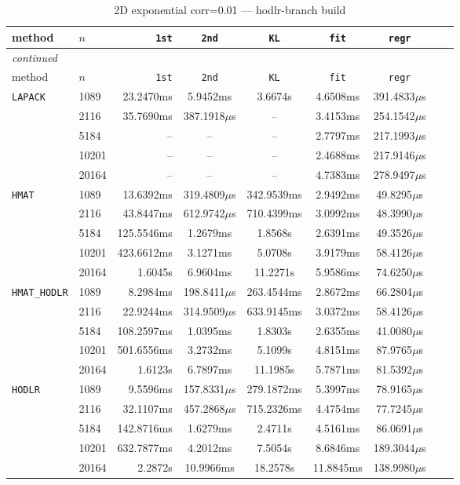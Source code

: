 \documentclass[11pt,a4paper]{article}
\begin{document}
\begin{center}
\begin{longtable}{llrcccccc}
\caption{2D exponential corr=0.01 --- hodlr-branch build}
\\\toprule
method & $n$ & \texttt{1st} & \texttt{2nd} & \texttt{KL} & \texttt{fit} & \texttt{regr}\\
\midrule
\endfirsthead
\multicolumn{8}{l}{\small\emph{continued}}\\
\toprule
method & $n$ & \texttt{1st} & \texttt{2nd} & \texttt{KL} & \texttt{fit} & \texttt{regr}\\
\midrule
\endhead

\texttt{LAPACK} & 1089 & 23.2470ms & 5.9452ms & 3.6674s & 4.6508ms & 391.4833$\mu$s\\
 & 2116 & 35.7690ms & 387.1918$\mu$s & -- & 3.4153ms & 254.1542$\mu$s\\
 & 5184 & -- & -- & -- & 2.7797ms & 217.1993$\mu$s\\
 & 10201 & -- & -- & -- & 2.4688ms & 217.9146$\mu$s\\
 & 20164 & -- & -- & -- & 4.7383ms & 278.9497$\mu$s\\
\texttt{HMAT} & 1089 & 13.6392ms & 319.4809$\mu$s & 342.9539ms & 2.9492ms & 49.8295$\mu$s\\
 & 2116 & 43.8447ms & 612.9742$\mu$s & 710.4399ms & 3.0992ms & 48.3990$\mu$s\\
 & 5184 & 125.5546ms & 1.2679ms & 1.8568s & 2.6391ms & 49.3526$\mu$s\\
 & 10201 & 423.6612ms & 3.1271ms & 5.0708s & 3.9179ms & 58.4126$\mu$s\\
 & 20164 & 1.6045s & 6.9604ms & 11.2271s & 5.9586ms & 74.6250$\mu$s\\
\texttt{HMAT\_HODLR} & 1089 & 8.2984ms & 198.8411$\mu$s & 263.4544ms & 2.8672ms & 66.2804$\mu$s\\
 & 2116 & 22.9244ms & 314.9509$\mu$s & 633.9145ms & 3.0372ms & 58.4126$\mu$s\\
 & 5184 & 108.2597ms & 1.0395ms & 1.8303s & 2.6355ms & 41.0080$\mu$s\\
 & 10201 & 501.6556ms & 3.2732ms & 5.1099s & 4.8151ms & 87.9765$\mu$s\\
 & 20164 & 1.6123s & 6.7897ms & 11.1985s & 5.7871ms & 81.5392$\mu$s\\
\texttt{HODLR} & 1089 & 9.5596ms & 157.8331$\mu$s & 279.1872ms & 5.3997ms & 78.9165$\mu$s\\
 & 2116 & 32.1107ms & 457.2868$\mu$s & 715.2326ms & 4.4754ms & 77.7245$\mu$s\\
 & 5184 & 142.8716ms & 1.6279ms & 2.4711s & 4.5161ms & 86.0691$\mu$s\\
 & 10201 & 632.7877ms & 4.2012ms & 7.5054s & 8.6846ms & 189.3044$\mu$s\\
 & 20164 & 2.2872s & 10.9966ms & 18.2578s & 11.8845ms & 138.9980$\mu$s\\
\bottomrule\end{longtable}\end{center}
\end{document}
